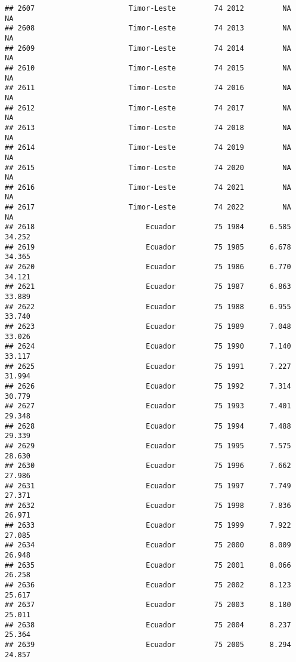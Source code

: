 \documentclass[
]{article}
\begin{document}
\begin{verbatim}
## 2607                      Timor-Leste         74 2012         NA         NA
## 2608                      Timor-Leste         74 2013         NA         NA
## 2609                      Timor-Leste         74 2014         NA         NA
## 2610                      Timor-Leste         74 2015         NA         NA
## 2611                      Timor-Leste         74 2016         NA         NA
## 2612                      Timor-Leste         74 2017         NA         NA
## 2613                      Timor-Leste         74 2018         NA         NA
## 2614                      Timor-Leste         74 2019         NA         NA
## 2615                      Timor-Leste         74 2020         NA         NA
## 2616                      Timor-Leste         74 2021         NA         NA
## 2617                      Timor-Leste         74 2022         NA         NA
## 2618                          Ecuador         75 1984      6.585     34.252
## 2619                          Ecuador         75 1985      6.678     34.365
## 2620                          Ecuador         75 1986      6.770     34.121
## 2621                          Ecuador         75 1987      6.863     33.889
## 2622                          Ecuador         75 1988      6.955     33.740
## 2623                          Ecuador         75 1989      7.048     33.026
## 2624                          Ecuador         75 1990      7.140     33.117
## 2625                          Ecuador         75 1991      7.227     31.994
## 2626                          Ecuador         75 1992      7.314     30.779
## 2627                          Ecuador         75 1993      7.401     29.348
## 2628                          Ecuador         75 1994      7.488     29.339
## 2629                          Ecuador         75 1995      7.575     28.630
## 2630                          Ecuador         75 1996      7.662     27.986
## 2631                          Ecuador         75 1997      7.749     27.371
## 2632                          Ecuador         75 1998      7.836     26.971
## 2633                          Ecuador         75 1999      7.922     27.085
## 2634                          Ecuador         75 2000      8.009     26.948
## 2635                          Ecuador         75 2001      8.066     26.258
## 2636                          Ecuador         75 2002      8.123     25.617
## 2637                          Ecuador         75 2003      8.180     25.011
## 2638                          Ecuador         75 2004      8.237     25.364
## 2639                          Ecuador         75 2005      8.294     24.857

\end{verbatim}
\end{document}
